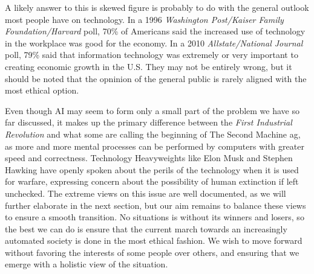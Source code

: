 A likely answer to this is skewed figure is probably to do with the 
general outlook most people have on technology. In a 1996 
\textit{Washington Post/Kaiser Family Foundation/Harvard} poll, 70\% of 
Americans said the increased use of technology in the workplace was good 
for the economy. In a 2010 \textit{Allstate/National Journal} poll, 
79\% said that information technology was extremely or very important 
to creating economic growth in the U.S. They may not be entirely wrong, 
but it should be noted that the opninion of the general public is rarely 
aligned with the most ethical option.


Even though AI may seem to form only a small part of the problem we have 
so far discussed, it makes up 
the primary difference between the \textit{First Industrial Revolution} 
and what some are calling the beginning of The Second Machine ag, as 
more and more mental processes can be performed by computers with 
greater speed and correctness.  Technology Heavyweights like Elon Musk 
and Stephen Hawking have openly spoken about the perils of the 
technology when it is used for warfare\cite{aidangers}, expressing 
concern about the possibility of human extinction if left unchecked. 
The extreme views on this issue are well documented, as we will further 
elaborate in the next section, but our aim remains to balance 
these views to ensure a smooth transition.  No situations is without 
its winners and losers, so the best we can do is ensure that the current 
march towards an increasingly automated society is done in the most 
ethical fashion. We wish to move forward without favoring the interests 
of some people over others, and ensuring that we emerge with a holistic 
view of the situation.


